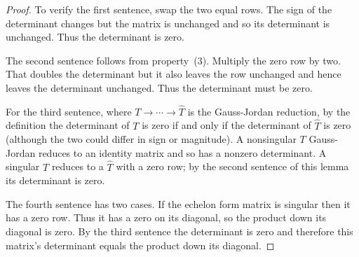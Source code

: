 \begin{proof}
To verify the first sentence, swap the two equal rows.
The sign of the determinant changes but the matrix is unchanged
and so its determinant is unchanged.
Thus the determinant is zero.

The second sentence follows from property~(3).
Multiply the zero row by two.
That doubles the determinant but it also
leaves the row unchanged and hence 
leaves the determinant unchanged. 
Thus the determinant must be zero.

For the third sentence, 
where $T \rightarrow\cdots\rightarrow\hat{T}$ is the
Gauss-Jordan reduction, by the definition
the determinant of $T$ is zero if and only if
the determinant of $\hat{T}$ is zero
(although the two could differ in sign or magnitude).
A nonsingular $T$ Gauss-Jordan reduces to an identity matrix
and so has a nonzero determinant.
A singular $T$ reduces to a $\hat{T}$ with a zero row;
by the second sentence of this lemma its determinant is zero.

The fourth sentence has two cases.
If the echelon form matrix is singular then
it has a zero row.
Thus it has a zero on its diagonal, so
the product down its diagonal is zero.
By the third sentence the determinant is zero and
therefore this matrix's determinant equals the
product down its diagonal.


\end{proof}
